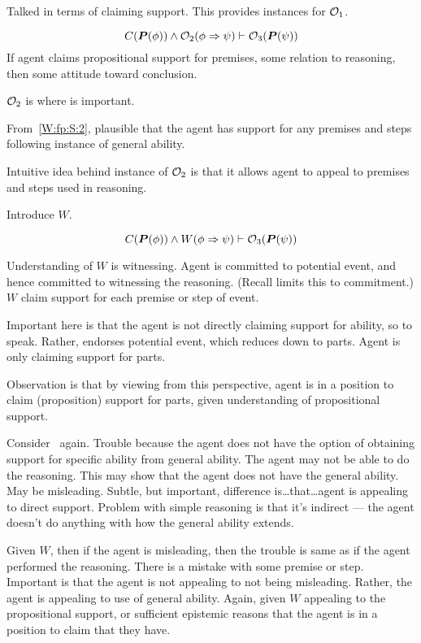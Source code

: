 \begin{note}
  Talked in terms of claiming support.
  This provides instances for \(\mathcal{O}_{1}\).

  \[C(\bm{P}(\phi)) \land \mathcal{O}_{2}(\phi \Rightarrow{} \psi) \vdash \mathcal{O}_{3}(\bm{P}(\psi))\]
  If agent claims propositional support for premises, some relation to reasoning, then some attitude toward conclusion.
\end{note}

\begin{note}[\(\geop{2}\)]
  \(\geop{2}\) is where \WR{} is important.

  From~\ref{W:fp:S:2}, plausible that the agent has support for any premises and steps following instance of general ability.

  Intuitive idea behind instance of \(\geop{2}\) is that it allows agent to appeal to premises and steps used in reasoning.

  Introduce \(W\).

  \[C(\bm{P}(\phi)) \land W(\phi \Rightarrow{} \psi) \vdash \mathcal{O}_{3}(\bm{P}(\psi))\]

  Understanding of \(W\) is witnessing.
  Agent is committed to potential event, and hence committed to witnessing the reasoning.
  (Recall \nI{} limits this to commitment.)
  \(W\) claim support for each premise or step of event.

  Important here is that the agent is not directly claiming support for ability, so to speak.
  Rather, endorses potential event, which reduces down to parts.
  Agent is only claiming support for parts.

  Observation is that by viewing from this perspective, agent is in a position to claim (proposition) support for parts, given understanding of propositional support.

  Consider~\nI{} again.
  Trouble because the agent does not have the option of obtaining support for specific ability from general ability.
  The agent may not be able to do the reasoning.
  This may show that the agent does not have the general ability.
  May be misleading.
  Subtle, but important, difference is\dots that\dots agent is appealing to direct support.
  Problem with simple reasoning is that it's indirect --- the agent doesn't do anything with how the general ability extends.

  Given \(W\), then if the agent is misleading, then the trouble is same as if the agent performed the reasoning.
  There is a mistake with some premise or step.
  Important is that the agent is not appealing to not being misleading.
  Rather, the agent is appealing to use of general ability.
  Again, given \(W\) appealing to the propositional support, or sufficient epistemic reasons that the agent is in a position to claim that they have.


\end{note}
